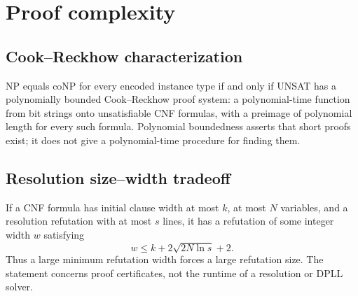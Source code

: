 \section{Proof complexity}

\begin{result}
\subsection{Cook--Reckhow characterization}
NP equals coNP for every encoded instance type if and only if UNSAT has a
polynomially bounded Cook--Reckhow proof system: a polynomial-time function from
bit strings onto unsatisfiable CNF formulas, with a preimage of polynomial length
for every such formula. Polynomial boundedness asserts that short proofs exist;
it does not give a polynomial-time procedure for finding them.
\citep{CookReckhow1979}
\end{result}

\begin{result}
\subsection{Resolution size--width tradeoff}
If a CNF formula has initial clause width at most $k$, at most $N$ variables,
and a resolution refutation with at most $s$ lines, it has a refutation of some
integer width $w$ satisfying
\[
w\le k+2\sqrt{2N\ln s}+2.
\]
Thus a large minimum refutation width forces a large refutation size. The
statement concerns proof certificates, not the runtime of a resolution or DPLL
solver.\citep{BenSassonWigderson2001}
\end{result}

